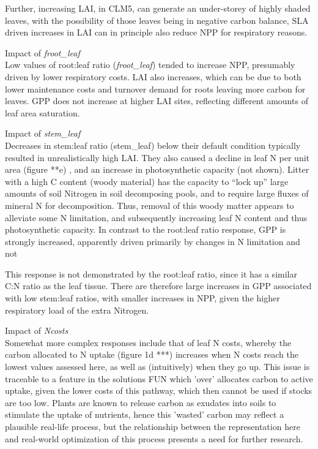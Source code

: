 \documentclass[draft,linenumbers]{agujournal}
\begin{document}
Further, increasing LAI, in CLM5, can generate an under-storey of highly shaded leaves, with the possibility of those leaves being in negative carbon balance,  SLA driven increases in LAI can in principle also reduce NPP for respiratory reasons. 

Impact of \emph{froot\_leaf}\\
Low values of root:leaf ratio (\emph{froot\_leaf}) tended to increase NPP, presumably driven by lower respiratory costs. LAI also increases, which can be due to both lower maintenance costs and turnover demand for roots leaving more carbon for leaves.  GPP does not increase at higher LAI sites, reflecting different amounts of leaf area saturation.

Impact of \emph{stem\_leaf}\\
Decreases in stem:leaf ratio (stem\_leaf) below their default condition typically resulted in unrealistically high LAI. They also caused a decline in leaf N per unit area (figure **e) , and an increase in photosynthetic capacity (not shown). Litter with a high C content (woody material) has the capacity to “lock up” large amounts of soil Nitrogen in soil decomposing pools, and to require large fluxes of mineral N for decomposition. Thus, removal of this woody matter appears to alleviate some N limitation, and subsequently increasing leaf N content and thus photosynthetic capacity.  In contrast to the root:leaf ratio response, GPP is strongly increased, apparently driven primarily by changes in N limitation and not 

This response is not demonstrated by the root:leaf ratio, since it has a similar C:N ratio as the leaf tissue. There are therefore large increases in GPP associated with low stem:leaf ratios, with smaller increases in NPP, given the higher respiratory load of the extra Nitrogen.

Impact of \emph{Ncosts}\\
Somewhat more complex responses include that of leaf N costs, whereby the carbon allocated to N uptake (figure 1d ***) increases when N costs reach the lowest values assessed here, as well as (intuitively) when they go up. This issue is traceable to a feature in the solutions FUN which 'over' allocates carbon to active uptake, given the lower costs of this pathway, which then cannot be used if stocks are too low. Plants are known to release carbon as exudates into soils to stimulate the uptake of nutrients, hence this 'wasted' carbon may reflect a plausible real-life process, but the relationship between the representation here and real-world optimization of this process presents a need for further research.
\end{document}
